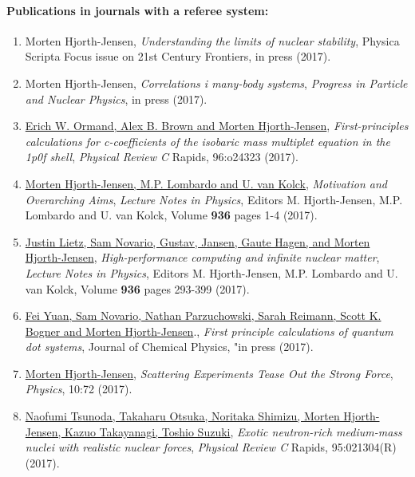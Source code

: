 \documentclass[a4wide,10pt]{article}
\begin{document}
\paragraph{Publications in journals with a referee system:}
\begin{enumerate}
\item Morten Hjorth-Jensen, \emph{Understanding the limits of nuclear stability}, Physica Scripta Focus issue on 21st Century Frontiers, in press (2017). 

\item Morten Hjorth-Jensen, \emph{Correlations i many-body systems}, \emph{Progress in Particle and Nuclear Physics}, in press (2017).

\item \href{{https://journals.aps.org/prc/abstract/10.1103/PhysRevC.96.024323}}{Erich W. Ormand, Alex B. Brown and Morten Hjorth-Jensen}, \emph{First-principles calculations for c-coefficients of the isobaric mass multiplet equation in the 1p0f shell}, \emph{Physical Review C} Rapids, 96:o24323 (2017). 

\item \href{{http://www.springer.com/us/book/9783319533353}}{Morten Hjorth-Jensen, M.P. Lombardo and U. van Kolck}, \emph{Motivation and Overarching Aims}, \emph{Lecture Notes in Physics}, Editors M. Hjorth-Jensen, M.P. Lombardo and U. van Kolck, Volume \textbf{936} pages 1-4 (2017).

\item \href{{http://www.springer.com/us/book/9783319533353}}{Justin Lietz, Sam Novario, Gustav, Jansen, Gaute Hagen, and Morten Hjorth-Jensen}, \emph{High-performance computing and infinite nuclear matter}, \emph{Lecture Notes in Physics}, Editors M. Hjorth-Jensen, M.P. Lombardo and U. van Kolck, Volume \textbf{936} pages 293-399 (2017).

\item \href{{http://lanl.arxiv.org/abs/1707.00229}}{Fei Yuan, Sam Novario, Nathan Parzuchowski, Sarah Reimann, Scott K. Bogner and Morten Hjorth-Jensen}.,   \emph{First principle calculations of quantum dot systems}, Journal of Chemical Physics, "in press (2017).

\item \href{{https://physics.aps.org/articles/v10/72}}{Morten Hjorth-Jensen}, \emph{Scattering Experiments Tease Out the Strong Force}, \emph{Physics}, 10:72 (2017).

\item \href{{https://journals.aps.org/prc/abstract/10.1103/PhysRevC.95.021304}}{Naofumi Tsunoda, Takaharu Otsuka, Noritaka Shimizu, Morten Hjorth-Jensen, Kazuo Takayanagi, Toshio Suzuki}, \emph{Exotic neutron-rich medium-mass nuclei with realistic nuclear forces}, \emph{Physical Review C} Rapids, 95:021304(R) (2017).


\end{enumerate}
\end{document}
